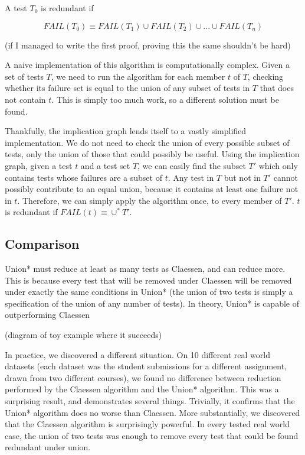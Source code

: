 \documentclass[11pt]{article}
\begin{document}
A test $T_0$ is redundant if

$$FAIL (T_0) \equiv FAIL(T_1) \cup FAIL(T_2) \cup ... \cup FAIL(T_n) $$

(if I managed to write the first proof, proving this the same shouldn't be hard)

A naive implementation of this algorithm is computationally complex. Given a set of tests $T$, we need to run the algorithm for each member $t$ of $T$, checking whether its failure set is equal to the union of any subset of tests in $T$ that does not contain $t$. This is simply too much work, so a different solution must be found.

Thankfully, the implication graph lends itself to a vastly simplified implementation. We do not need to check the union of every possible subset of tests, only the union of those that could possibly be useful. Using the implication graph, given a test $t$ and a test set $T$, we can easily find the subset $T\prime$ which only contains tests whose failures are a subset of $t$. Any test in $T$ but not in $T\prime$ cannot possibly contribute to an equal union, because it contains at least one failure not in $t$. Therefore, we can simply apply the algorithm once, to every member of $T\prime$. $t$ is redundant if $FAIL(t) \equiv \cup^* T\prime$.

\subsection{Comparison}
Union* must reduce at least as many tests as Claessen, and can reduce more. This is because every test that will be removed under Claessen will be removed under exactly the same conditions in Union* (the union of two tests is simply a specification of the union of any number of tests). In theory, Union* is capable of outperforming Claessen

(diagram of toy example where it succeeds)

In practice, we discovered a different situation. On 10 different real world datasets (each dataset was the student submissions for a different assignment, drawn from two different courses), we found no difference between reduction performed by the Claessen algorithm and the Union* algorithm. This was a surprising result, and demonstrates several things. Trivially, it confirms that the Union* algorithm does no worse than Claessen. More substantially, we discovered that the Claessen algorithm is surprisingly powerful. In every tested real world case, the union of two tests was enough to remove every test that could be found redundant under union.
\end{document}
